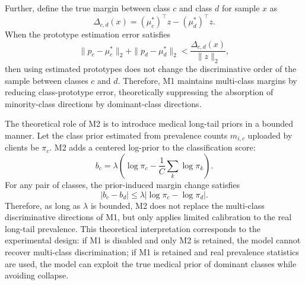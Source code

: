 \documentclass[letterpaper]{article}
\begin{document}
Further, define the true margin between class $c$ and class $d$ for sample $x$ as
\begin{equation}
\Delta_{c,d}(x)=(\mu_c^*)^\top z-(\mu_d^*)^\top z.
\end{equation}
When the prototype estimation error satisfies
\begin{equation}
\|p_c-\mu_c^*\|_2+\|p_d-\mu_d^*\|_2
<
\frac{\Delta_{c,d}(x)}{\|z\|_2},
\end{equation}
then using estimated prototypes does not change the discriminative order of the sample between classes $c$ and $d$. Therefore, M1 maintains multi-class margins by reducing class-prototype error, theoretically suppressing the absorption of minority-class directions by dominant-class directions.

The theoretical role of M2 is to introduce medical long-tail priors in a bounded manner. Let the class prior estimated from prevalence counts $m_{i,c}$ uploaded by clients be $\pi_c$. M2 adds a centered log-prior to the classification score:
\begin{equation}
b_c=\lambda\left(\log\pi_c-\frac{1}{C}\sum_k\log\pi_k\right).
\end{equation}
For any pair of classes, the prior-induced margin change satisfies
\begin{equation}
|b_c-b_d|\le \lambda|\log\pi_c-\log\pi_d|.
\end{equation}
Therefore, as long as $\lambda$ is bounded, M2 does not replace the multi-class discriminative directions of M1, but only applies limited calibration to the real long-tail prevalence. This theoretical interpretation corresponds to the experimental design: if M1 is disabled and only M2 is retained, the model cannot recover multi-class discrimination; if M1 is retained and real prevalence statistics are used, the model can exploit the true medical prior of dominant classes while avoiding collapse.
\end{document}
